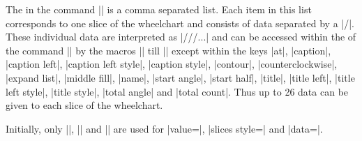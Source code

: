 \documentclass[a4paper,english,dvipsnames]{ltxdoc}
\begin{document}
\begin{command}{\WCvarZ}
The  in the command |\wheelchart| is a comma separated list. Each item in this list corresponds to one slice of the wheelchart and consists of data separated by a |/|. These individual data are interpreted as |\WCvarA/\WCvarB/\WCvarC/...| and can be accessed within the  of the command |\wheelchart| by the macros |\WCvarA| till |\WCvarZ| except within the keys |at|, |caption|, |caption left|, |caption left style|, |caption style|, |contour|, |counterclockwise|, |expand list|, |middle fill|, |name|, |start angle|, |start half|, |title|, |title left|, |title left style|, |title style|, |total angle| and |total count|. Thus up to 26 data can be given to each slice of the wheelchart.

Initially, only |\WCvarA|, |\WCvarB| and |\WCvarC| are used for |value=\WCvarA|, |slices style=\WCvarB| and |data=\WCvarC|.
\begin{codeexample}[width=10cm,preamble={\usetikzlibrary{patterns}}]
\begin{tikzpicture}
\wheelchart[
    data={},
    gap,
    radius={0.5}{3},
    slices style={\WCvarB!70,draw=\WCvarH,ultra thick,pattern=\WCvarE,pattern color=\WCvarB!70},
    value=1,
    wheel data=\WCvarC,
]{\exampleforthismanual}
\wheelchart[
    data={\textcolor{\WCvarB}{Vitamines}\\\WCvarD},
    gap,
    radius={3.1}{4},
    slices arrow={1}{0.2},
    value=1
]{\exampleforthismanual}
\end{tikzpicture}
\end{codeexample}
\end{command}
\end{document}
